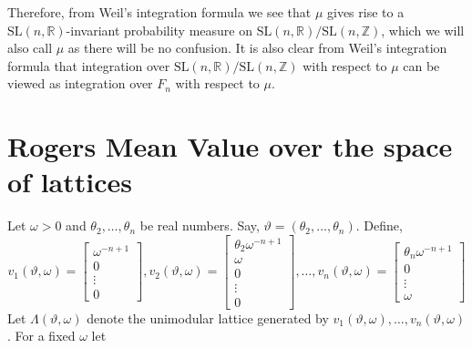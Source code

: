 \documentclass[11pt]{article}
\theoremstyle{definition}
\theoremstyle{proof}
\begin{document}
Therefore, from Weil's integration formula we see that $\mu$ gives rise to a $\mathrm{SL}(n,\mathbb{R})$-invariant probability measure on $\mathrm{SL}(n,\mathbb{R})/\mathrm{SL}(n,\mathbb{Z})$, which we will also call $\mu$ as there will be no confusion.
It is also clear from Weil's integration formula that integration over $\mathrm{SL}(n,\mathbb{R})/\mathrm{SL}(n,\mathbb{Z})$ with respect to $\mu$ can be viewed as integration over $F_n$ with respect to $\mu$.

\section{Rogers Mean Value over the space of lattices}
Let $\omega > 0$ and $\theta _2, \ldots, \theta _n$ be real numbers.
Say, $\vartheta = (\theta _2, \ldots, \theta _n)$.
Define,
\[
    v_1(\vartheta , \omega ) = 
    \begin{bmatrix}
        \omega ^{-n+1} \\
        0 \\
        \vdots \\
        0
    \end{bmatrix}
    ,
    v_2(\vartheta , \omega ) = 
    \begin{bmatrix}
        \theta _2 \omega ^{-n+1} \\
        \omega  \\
        0 \\
        \vdots \\
        0
    \end{bmatrix}
    , \ldots,
    v_n(\vartheta , \omega ) = 
    \begin{bmatrix}
        \theta _n \omega ^{-n+1} \\
        0 \\
        \vdots \\
        \omega 
    \end{bmatrix}
\]
Let $\Lambda (\vartheta , \omega )$ denote the unimodular lattice generated by $v_1(\vartheta , \omega ), \ldots , v_n(\vartheta , \omega )$.
For a fixed $\omega$ let
\end{document}

